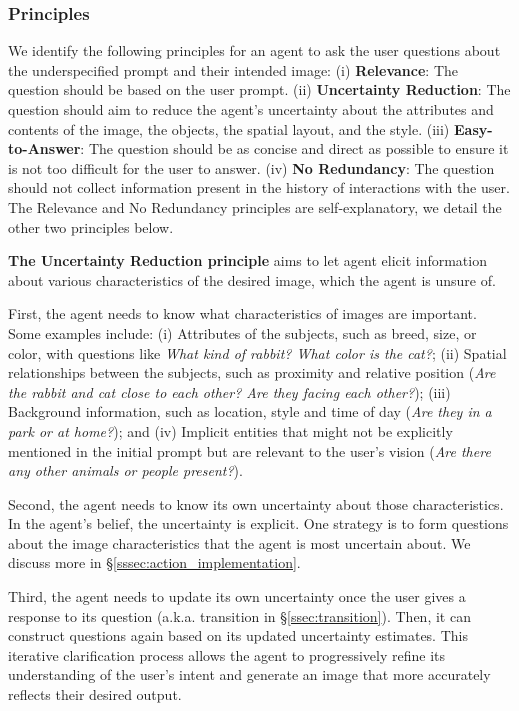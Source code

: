 \subsubsection{Principles} \label{ssec:principles}
We identify the following principles for an agent to ask the user questions about the underspecified prompt and their intended image: (i) \textbf{Relevance}: The question should be based on the user prompt. (ii) \textbf{Uncertainty Reduction}: The question should aim to reduce the agent's uncertainty about the attributes and contents of the image, the objects, the spatial layout, and the style. (iii) \textbf{Easy-to-Answer}: The question should be as concise and direct as possible to ensure it is not too difficult for the user to answer. (iv) \textbf{No Redundancy}: The question should not collect information present in the history of interactions with the user. The Relevance and No Redundancy principles are self-explanatory, we detail the other two principles below.

\textbf{The Uncertainty Reduction principle} aims to let agent  elicit information about various characteristics of the desired image, which the agent is unsure of. 


First, the agent needs to know what characteristics of images are important. Some examples include: (i) Attributes of the subjects, such as breed, size, or color, with questions like \textit{What kind of rabbit? What color is the cat?}; (ii) Spatial relationships between the subjects, such as proximity and relative position (\textit{Are the rabbit and cat close to each other? Are they facing each other?}); (iii) Background information, such as location, style and time of day (\textit{Are they in a park or at home?}); and (iv) Implicit entities that might not be explicitly mentioned in the initial prompt but are relevant to the user's vision (\textit{Are there any other animals or people present?}).

Second, the agent needs to know its own uncertainty about those characteristics. In the agent's belief, the uncertainty is explicit. One strategy is to form questions about the image characteristics that the agent is most uncertain about. We discuss more in \S\ref{sssec:action_implementation}.

Third, the agent needs to update its own uncertainty once the user gives a response to its question (a.k.a. transition in \S\ref{ssec:transition}). Then, it can construct questions again based on its updated uncertainty estimates. This iterative clarification process allows the agent to progressively refine its understanding of the user's intent and generate an image that more accurately reflects their desired output.

